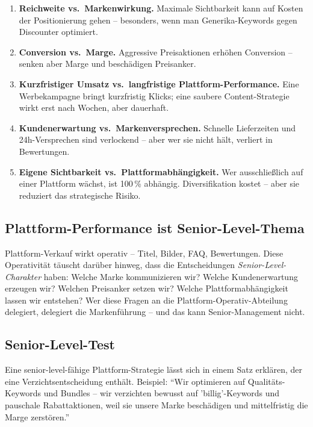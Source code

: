 \documentclass[11pt,a4paper,oneside]{article}
\begin{document}
\begin{enumerate}
  \item \textbf{Reichweite vs.\ Markenwirkung.} Maximale Sichtbarkeit kann auf Kosten der Positionierung gehen -- besonders, wenn man Generika-Keywords gegen Discounter optimiert.
  \item \textbf{Conversion vs.\ Marge.} Aggressive Preisaktionen erhöhen Conversion -- senken aber Marge und beschädigen Preisanker.
  \item \textbf{Kurzfristiger Umsatz vs.\ langfristige Plattform-Performance.} Eine Werbekampagne bringt kurzfristig Klicks; eine saubere Content-Strategie wirkt erst nach Wochen, aber dauerhaft.
  \item \textbf{Kundenerwartung vs.\ Markenversprechen.} Schnelle Lieferzeiten und 24h-Versprechen sind verlockend -- aber wer sie nicht hält, verliert in Bewertungen.
  \item \textbf{Eigene Sichtbarkeit vs.\ Plattformabhängigkeit.} Wer ausschließlich auf einer Plattform wächst, ist 100\,\% abhängig. Diversifikation kostet -- aber sie reduziert das strategische Risiko.
\end{enumerate}

\subsection{Plattform-Performance ist Senior-Level-Thema}

Plattform-Verkauf wirkt operativ -- Titel, Bilder, FAQ, Bewertungen. Diese Operativität täuscht darüber hinweg, dass die Entscheidungen \emph{Senior-Level-Charakter} haben: Welche Marke kommunizieren wir? Welche Kundenerwartung erzeugen wir? Welchen Preisanker setzen wir? Welche Plattform­abhängigkeit lassen wir entstehen? Wer diese Fragen an die Plattform-Operativ-Abteilung delegiert, delegiert die Markenführung -- und das kann Senior-Management nicht.

\subsection{Senior-Level-Test}

Eine senior-level-fähige Plattform-Strategie lässt sich in einem Satz erklären, der eine Verzichtsentscheidung enthält. Beispiel: ``Wir optimieren auf Qualitäts-Keywords und Bundles -- wir verzichten bewusst auf 'billig'-Keywords und pauschale Rabattaktionen, weil sie unsere Marke beschädigen und mittelfristig die Marge zerstören.''
\end{document}
